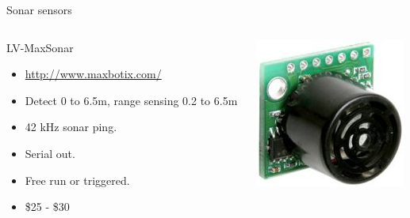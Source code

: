 \documentclass[compress]{beamer}
\begin{document}
\begin{frame}{Sonar sensors}

    \begin{columns}
        \begin{column}{0.6\linewidth}

            LV-MaxSonar

            \begin{itemize}
                \item \url{http://www.maxbotix.com/}
                \item Detect 0 to 6.5m, range sensing 0.2 to 6.5m
                \item 42 kHz sonar ping.
                \item Serial out.
                \item Free run or triggered.
                \item \$25 - \$30
            \end{itemize}

        \end{column}
        \begin{column}{0.4\linewidth}

            \begin{center}
                \includegraphics[width=0.8\linewidth]{maxbotix-lvmax}
            \end{center}
        \end{column}
    \end{columns}
\end{frame}
\end{document}
